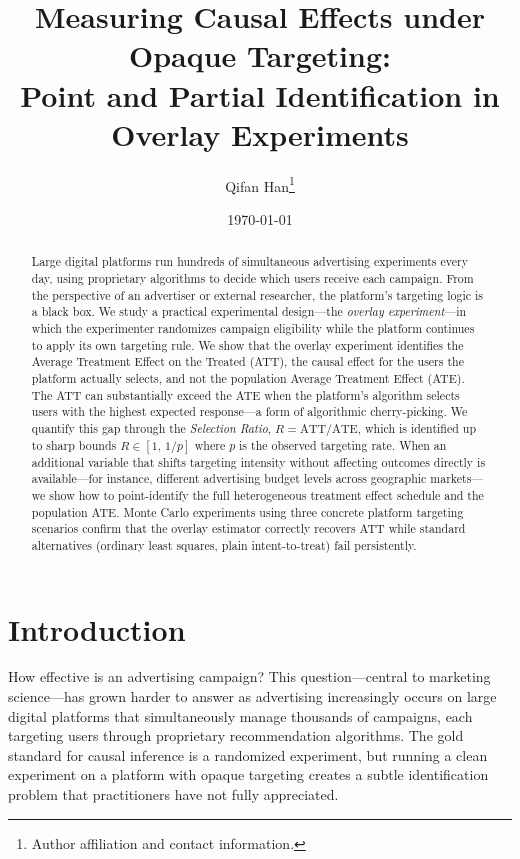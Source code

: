 \documentclass[12pt]{article}
\title{Measuring Causal Effects under Opaque Targeting:\\
       Point and Partial Identification in Overlay Experiments}
\author{Qifan Han\thanks{Author affiliation and contact information.}}
\date{\today}
\begin{document}
\maketitle

\begin{abstract}
Large digital platforms run hundreds of simultaneous advertising experiments
every day, using proprietary algorithms to decide which users receive each
campaign. From the perspective of an advertiser or external researcher, the
platform's targeting logic is a black box. We study a practical experimental
design---the \emph{overlay experiment}---in which the experimenter randomizes
campaign eligibility while the platform continues to apply its own targeting
rule. We show that the overlay experiment identifies the Average Treatment
Effect on the Treated (ATT), the causal effect for the users the platform
actually selects, and not the population Average Treatment Effect (ATE). The
ATT can substantially exceed the ATE when the platform's algorithm selects
users with the highest expected response---a form of algorithmic
cherry-picking. We quantify this gap through the \emph{Selection Ratio},
$R = \mathrm{ATT}/\mathrm{ATE}$, which is identified up to sharp bounds
$R \in [1,\, 1/p]$ where $p$ is the observed targeting rate. When an
additional variable that shifts targeting intensity without affecting outcomes
directly is available---for instance, different advertising budget levels
across geographic markets---we show how to point-identify the full
heterogeneous treatment effect schedule and the population ATE. Monte Carlo
experiments using three concrete platform targeting scenarios confirm that
the overlay estimator correctly recovers ATT while standard alternatives
(ordinary least squares, plain intent-to-treat) fail persistently.
\end{abstract}

\clearpage
\section{Introduction}
\label{sec:intro}

How effective is an advertising campaign? This question---central to marketing
science---has grown harder to answer as advertising increasingly occurs on
large digital platforms that simultaneously manage thousands of campaigns,
each targeting users through proprietary recommendation algorithms. The gold
standard for causal inference is a randomized experiment, but running a
clean experiment on a platform with opaque targeting creates a subtle
identification problem that practitioners have not fully appreciated.
\end{document}
